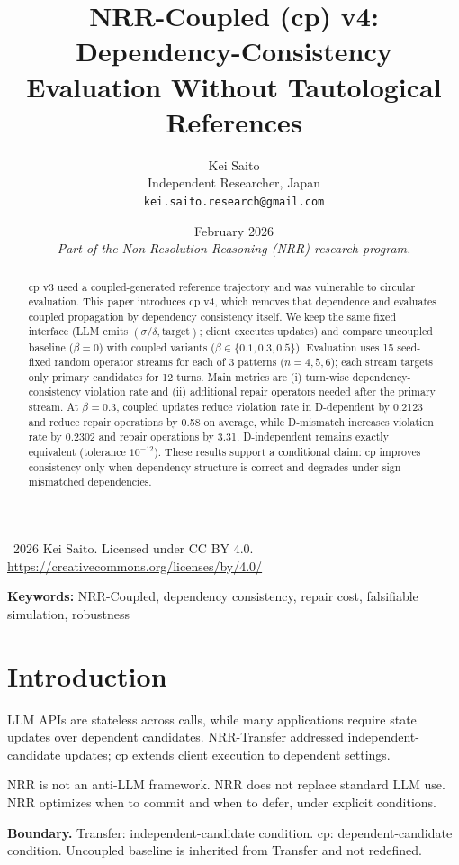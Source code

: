 \documentclass[11pt,a4paper]{article}
\title{\textbf{NRR-Coupled (cp) v4: Dependency-Consistency Evaluation Without Tautological References}}
\author{Kei Saito\\Independent Researcher, Japan\\\texttt{kei.saito.research@gmail.com}}
\date{February 2026\\[0.5em]\textit{Part of the Non-Resolution Reasoning (NRR) research program.}}
\begin{document}
\maketitle

\begin{center}
\textcopyright\ 2026 Kei Saito. Licensed under CC BY 4.0.\\
\url{https://creativecommons.org/licenses/by/4.0/}
\end{center}

\begin{abstract}
cp v3 used a coupled-generated reference trajectory and was vulnerable to circular evaluation. This paper introduces cp v4, which removes that dependence and evaluates coupled propagation by dependency consistency itself. We keep the same fixed interface (LLM emits \((\sigma/\delta,\text{target})\); client executes updates) and compare uncoupled baseline (\(\beta=0\)) with coupled variants (\(\beta\in\{0.1,0.3,0.5\}\)). Evaluation uses 15 seed-fixed random operator streams for each of 3 patterns (\(n=4,5,6\)); each stream targets only primary candidates for 12 turns. Main metrics are (i) turn-wise dependency-consistency violation rate and (ii) additional repair operators needed after the primary stream. At \(\beta=0.3\), coupled updates reduce violation rate in D-dependent by 0.2123 and reduce repair operations by 0.58 on average, while D-mismatch increases violation rate by 0.2302 and repair operations by 3.31. D-independent remains exactly equivalent (tolerance \(10^{-12}\)). These results support a conditional claim: cp improves consistency only when dependency structure is correct and degrades under sign-mismatched dependencies.
\end{abstract}

\noindent\textbf{Keywords:} NRR-Coupled, dependency consistency, repair cost, falsifiable simulation, robustness

\section{Introduction}
LLM APIs are stateless across calls, while many applications require state updates over dependent candidates. NRR-Transfer addressed independent-candidate updates; cp extends client execution to dependent settings.

NRR is not an anti-LLM framework.
NRR does not replace standard LLM use.
NRR optimizes when to commit and when to defer, under explicit conditions.

\textbf{Boundary.}
Transfer: independent-candidate condition.
cp: dependent-candidate condition.
Uncoupled baseline is inherited from Transfer and not redefined.
\end{document}

